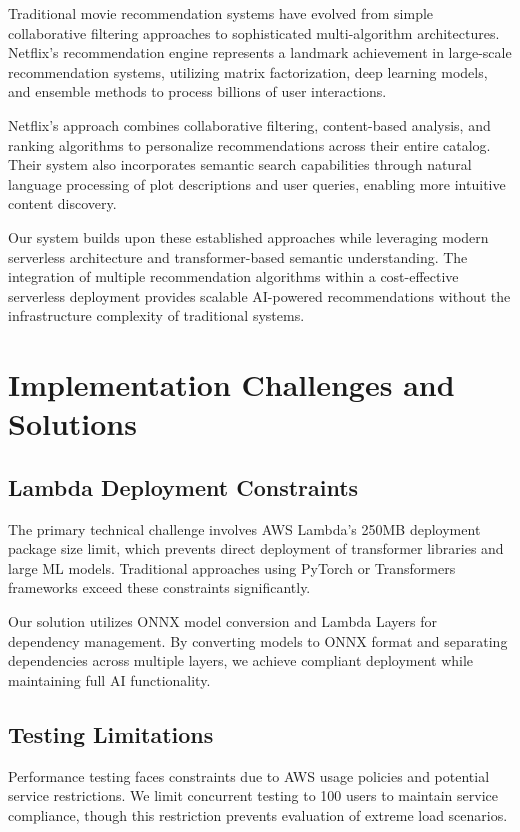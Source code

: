 \documentclass[conference]{IEEEtran}
\begin{document}
Traditional movie recommendation systems have evolved from simple collaborative filtering approaches to sophisticated multi-algorithm architectures. Netflix's recommendation engine represents a landmark achievement in large-scale recommendation systems, utilizing matrix factorization, deep learning models, and ensemble methods to process billions of user interactions.

Netflix's approach combines collaborative filtering, content-based analysis, and ranking algorithms to personalize recommendations across their entire catalog. Their system also incorporates semantic search capabilities through natural language processing of plot descriptions and user queries, enabling more intuitive content discovery.

Our system builds upon these established approaches while leveraging modern serverless architecture and transformer-based semantic understanding. The integration of multiple recommendation algorithms within a cost-effective serverless deployment provides scalable AI-powered recommendations without the infrastructure complexity of traditional systems.

\section{Implementation Challenges and Solutions}

\subsection{Lambda Deployment Constraints}

The primary technical challenge involves AWS Lambda's 250MB deployment package size limit, which prevents direct deployment of transformer libraries and large ML models. Traditional approaches using PyTorch or Transformers frameworks exceed these constraints significantly.

Our solution utilizes ONNX model conversion and Lambda Layers for dependency management. By converting models to ONNX format and separating dependencies across multiple layers, we achieve compliant deployment while maintaining full AI functionality.

\subsection{Testing Limitations}

Performance testing faces constraints due to AWS usage policies and potential service restrictions. We limit concurrent testing to 100 users to maintain service compliance, though this restriction prevents evaluation of extreme load scenarios.
\end{document}
